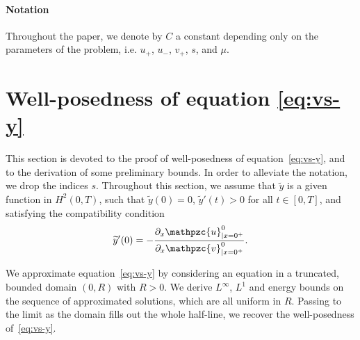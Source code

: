 \documentclass[AHL,Unicode,longabstracts,published]{cedram}
\newcommand{\p}{\partial}
\newcommand{\tv}{\mathpzc{v}}
\newcommand{\tu}{\mathpzc{u}}
\newcommand{\ty}{\widetilde{y}}
\begin{document}
\paragraph{Notation}
Throughout the paper, we denote by $C$ a constant depending only on the parameters of the problem, i.e. $u_+$, $u_-$, $v_+$, $s$, and $\mu$.



\section{Well-posedness of equation \texorpdfstring{\eqref{eq:vs-y}}{eqv}}\label{sec:v-WP}


This section is devoted to the proof of well-posedness of equation~\eqref{eq:vs-y}, and to the derivation of some preliminary bounds. In order to alleviate the notation, we drop the indices $s$. Throughout this section, we assume that $\ty$ is a given function in $H^2(0,T)$, such that $\ty(0)=0$, $\ty'(t)>0$ for all $t\in [0,T]$, and satisfying the compatibility condition
\begin{equation}\label{compatibility-ty}
\ty'(0)=-\frac{\p_x \tu^0_{|x=0^+}}{\p_x \tv^0_{|x=0^+}}.
\end{equation}



We approximate equation~\eqref{eq:vs-y} by considering an equation in a truncated, bounded domain $(0,R)$ with $R>0$. We derive $L^\infty$, $L^1$ and energy bounds on the sequence of approximated solutions, which are all uniform in $R$. Passing to the limit as the domain fills out the whole half-line, we recover the well-posedness of~\eqref{eq:vs-y}.
\end{document}
